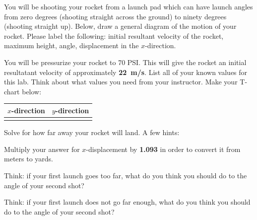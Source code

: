 \documentclass[10pt]{exam}
\begin{document}
\begin{questions}

  \question \label{diagram}
    You will be shooting your rocket from a launch pad which can have launch angles from zero degrees (shooting straight across the ground) to ninety degrees (shooting straight up).  Below, draw a general diagram of the motion of your rocket.  Please label the following: initial resultant velocity of the rocket, maximum height, angle, displacement in the $x$-direction.

    \vspace{6em}


  \pagebreak

  \question \label{t-chart}
    You will be pressurize your rocket to 70 PSI.  This will give the rocket an initial resultatant velocity of approximately \textbf{22~m/s}.  List all of your known values for this lab.  Think about what values you need from your instructor.  Make your T-chart below:

    \begin{center}
      \begin{tabular}{l|c}
        $x$-direction & $y$-direction \\\hline
        & \\[6em]
      \end{tabular}
    \end{center}

  \question \label{calc}
    Solve for how far away your rocket will land.  A few hints:


    \vs

  \question \label{convert}
    Multiply your answer for $x$-displacement by \textbf{1.093} in order to convert it from meters to yards.
    \vspace{4em}

  \pagebreak

  \question \label{too-far}
    Think: if your first launch goes too far, what do you think you should do to the angle of your second shot?
    \vspace{4em}

  \question \label{too-short}
    Think: if your first launch does not go far enough, what do you think you should do to the angle of your second shot?
    \vspace{4em}


\end{questions}
\end{document}
